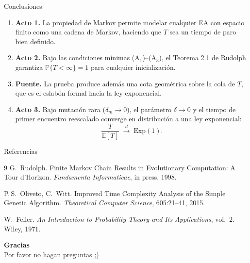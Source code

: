 \documentclass[aspectratio=169]{beamer}
\newcommand{\Prob}{\mathbb{P}}
\begin{document}
\begin{frame}{Conclusiones}
  \begin{enumerate}
    \item \textcolor{act1}{\textbf{Acto 1.}}
          La propiedad de Markov permite modelar cualquier EA con
          espacio finito como una cadena de Markov, haciendo que
          $T$ sea un tiempo de paro bien definido.

    \bigskip
    \item \textcolor{act2}{\textbf{Acto 2.}}
          Bajo las condiciones mínimas (A$_1$)--(A$_3$), el
          Teorema 2.1 de Rudolph garantiza $\Prob\{T<\infty\}=1$
          para cualquier inicialización.

    \bigskip
    \item \textcolor{puente}{\textbf{Puente.}}
          La prueba produce además una cota geométrica sobre la cola
          de $T$, que es el eslabón formal hacia la ley exponencial.

    \bigskip
    \item \textcolor{act3}{\textbf{Acto 3.}}
          Bajo mutación rara ($\delta_m \to 0$), el parámetro
          $\delta \to 0$ y el tiempo de primer encuentro reescalado
          converge en distribución a una \alert{ley exponencial}:
          \[
            \frac{T}{\mathbb{E}[T]}
            \;\xrightarrow{d}\;
            \mathrm{Exp}(1).
          \]
  \end{enumerate}
\end{frame}

\begin{frame}{Referencias}
  \begin{thebibliography}{9}
      G.~Rudolph.
      \newblock Finite Markov Chain Results in Evolutionary Computation:
        A Tour d'Horizon.
      \newblock \emph{Fundamenta Informaticae}, in press, 1998.

      P.\,S.~Oliveto, C.~Witt.
      \newblock Improved Time Complexity Analysis of the Simple Genetic
        Algorithm.
      \newblock \emph{Theoretical Computer Science}, 605:21--41, 2015.

      W.~Feller.
      \newblock \emph{An Introduction to Probability Theory and Its
        Applications}, vol.~2.
      \newblock Wiley, 1971.
  \end{thebibliography}
\end{frame}

\begin{frame}{}
  \begin{center}
    {\Large \textbf{Gracias}}\\[12pt]
    \large Por favor no hagan preguntas ;) 
  \end{center}
\end{frame}
\end{document}
